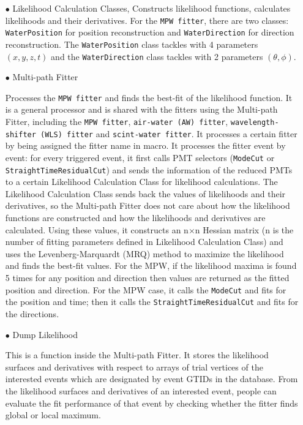 \begin{itemize}
	
	\item[$\bullet$]  Likelihood Calculation Classes, 
	Constructs likelihood functions, calculates likelihoods and their derivatives. For the \texttt{MPW fitter}, there are two classes: \texttt{WaterPosition} for position reconstruction and \texttt{WaterDirection} for direction reconstruction. The \texttt{WaterPosition} class tackles with 4 parameters $(x,y,z,t)$ and the \texttt{WaterDirection} class tackles with 2 parameters $(\theta,\phi)$. 
	
	\item[$\bullet$] Multi-path Fitter
	
	Processes the \texttt{MPW fitter} and finds the best-fit of the likelihood function. It is a general processor and is shared with the fitters using the Multi-path Fitter, including the \texttt{MPW fitter}, \texttt{air-water (AW) fitter}, \texttt{wavelength-shifter (WLS) fitter} and \texttt{scint-water fitter}. It processes a certain fitter by being assigned the fitter name in macro. It processes the fitter event by event: for every triggered event, it first calls PMT selectors (\texttt{ModeCut} or \texttt{StraightTimeResidualCut}) and sends the information of the reduced PMTs to a certain Likelihood Calculation Class for likelihood calculations. The Likelihood Calculation Class sends back the values of likelihoods and their derivatives, so the Multi-path Fitter does not care about how the likelihood functions are constructed and how the likelihoods and derivatives are calculated. Using these values, it constructs an n$\times$n Hessian matrix (n is the number of fitting parameters defined in Likelihood Calculation Class) and uses the Levenberg-Marquardt (MRQ) method to maximize the likelihood and finds the best-fit values. For the MPW, if the likelihood maxima is found 5 times for any position and direction then values are returned as the fitted position and direction. For the MPW case, it calls the \texttt{ModeCut} and fits for the position and time; then it calls the \texttt{StraightTimeResidualCut} and fits for the directions.
	
	\item[$\bullet$] Dump Likelihood
	
	This is a function inside the Multi-path Fitter. It stores the likelihood surfaces and derivatives with respect to arrays of trial vertices of the interested events which are designated by event GTIDs in the database. From the likelihood surfaces and derivatives of an interested event, people can evaluate the fit performance of that event by checking whether the fitter finds global or local maximum. 
	

\end{itemize}
